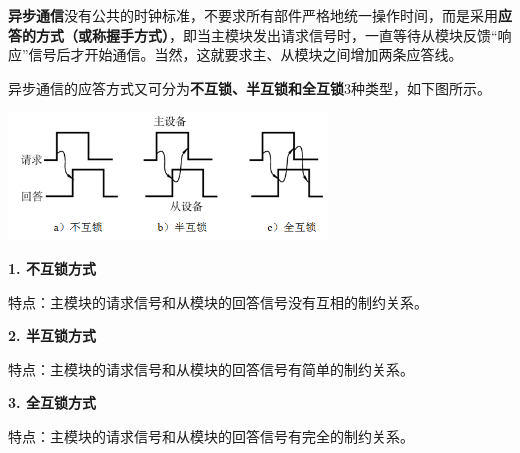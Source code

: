\textbf{{异步通信}}没有公共的时钟标准，不要求所有部件严格地统一操作时间，而是采用\textbf{应答的方式（或称握手方式）}，即当主模块发出请求信号时，一直等待从模块反馈``响应''信号后才开始通信。当然，这就要求主、从模块之间增加两条应答线。

异步通信的应答方式又可分为\textbf{不互锁、半互锁和全互锁}3种类型，如下图所示。

\includegraphics[width=3.33333in,height=1.33333in]{png-jpeg-pics/AE32CB814F07430268B0F6C028FF34B7.png}

{\textbf{1. 不互锁方式}}

特点：主模块的请求信号和从模块的回答信号没有互相的制约关系。

\textbf{{2. 半互锁方式}}

特点：主模块的请求信号和从模块的回答信号有简单的制约关系。

{\textbf{3. 全互锁方式}}

特点：主模块的请求信号和从模块的回答信号有完全的制约关系。
